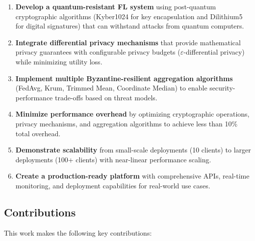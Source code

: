 \documentclass[12pt,a4paper]{article}
\begin{document}
\begin{enumerate}
    \item \textbf{Develop a quantum-resistant FL system} using post-quantum cryptographic algorithms (Kyber1024 for key encapsulation and Dilithium5 for digital signatures) that can withstand attacks from quantum computers.
    
    \item \textbf{Integrate differential privacy mechanisms} that provide mathematical privacy guarantees with configurable privacy budgets ($\varepsilon$-differential privacy) while minimizing utility loss.
    
    \item \textbf{Implement multiple Byzantine-resilient aggregation algorithms} (FedAvg, Krum, Trimmed Mean, Coordinate Median) to enable security-performance trade-offs based on threat models.
    
    \item \textbf{Minimize performance overhead} by optimizing cryptographic operations, privacy mechanisms, and aggregation algorithms to achieve less than 10\% total overhead.
    
    \item \textbf{Demonstrate scalability} from small-scale deployments (10 clients) to larger deployments (100+ clients) with near-linear performance scaling.
    
    \item \textbf{Create a production-ready platform} with comprehensive APIs, real-time monitoring, and deployment capabilities for real-world use cases.
\end{enumerate}

\subsection{Contributions}

This work makes the following key contributions:
\end{document}
